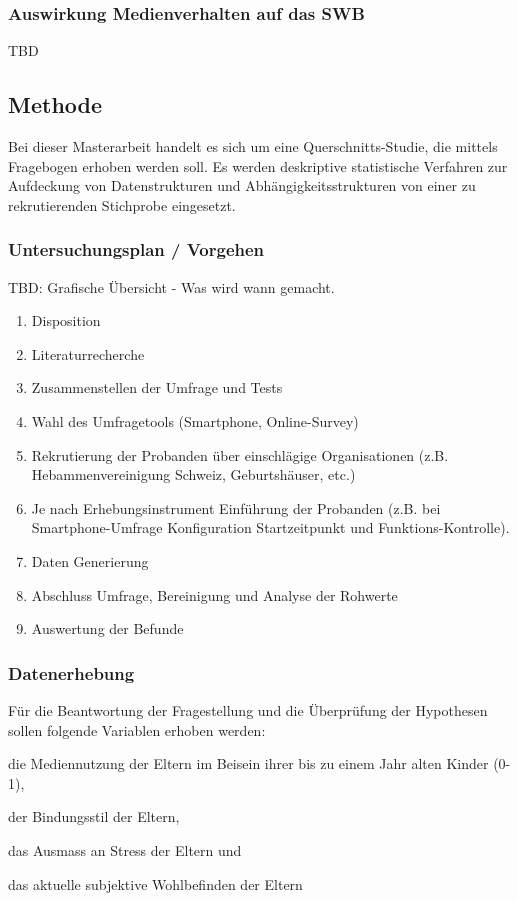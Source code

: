 \subsubsection{Auswirkung Medienverhalten auf das SWB}
TBD

\subsection{Methode}
Bei dieser Masterarbeit handelt es sich um eine Querschnitts-Studie, die mittels Fragebogen erhoben werden soll. 
Es werden deskriptive statistische Verfahren zur Aufdeckung von Datenstrukturen und Abhängigkeitsstrukturen von einer zu rekrutierenden Stichprobe eingesetzt.
\subsubsection{Untersuchungsplan / Vorgehen}
TBD: Grafische Übersicht - Was wird wann gemacht.
\begin{enumerate}
    \item Disposition
    \item Literaturrecherche
    \item Zusammenstellen der Umfrage und Tests
    \item Wahl des Umfragetools (Smartphone, Online-Survey)
    \item Rekrutierung der Probanden über einschlägige Organisationen (z.B. Hebammenvereinigung Schweiz, Geburtshäuser, etc.)
    \item Je nach Erhebungsinstrument Einführung der Probanden (z.B. bei Smartphone-Umfrage Konfiguration Startzeitpunkt und Funktions-Kontrolle).
    \item Daten Generierung
    \item Abschluss Umfrage, Bereinigung und Analyse der Rohwerte
    \item Auswertung der Befunde
\end{enumerate}
\subsubsection{Datenerhebung}
Für die Beantwortung der Fragestellung und die Überprüfung der Hypothesen sollen folgende Variablen erhoben werden: 
\begin{seriate}
    \item die Mediennutzung der Eltern im Beisein ihrer bis zu einem Jahr alten Kinder (0-1),
    \item der Bindungsstil der Eltern, 
    \item das Ausmass an Stress der Eltern und
    \item das aktuelle subjektive Wohlbefinden der Eltern
\end{seriate}

